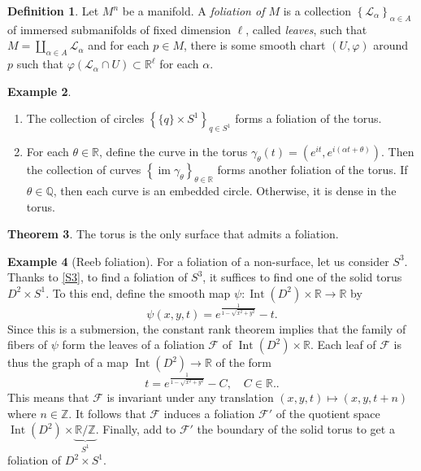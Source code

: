 \documentclass[10pt,letterpaper,cm]{nupset}
\theoremstyle{definition}
\newtheorem{definition}{Definition}[subsection]
\newtheorem{exmp}[definition]{Example}
\theoremstyle{theorem}
\newtheorem{theorem}[definition]{Theorem}
\theoremstyle{remark}
\renewcommand{\L}{\mathscr L}
\newcommand{\Q}{\mathbb Q}
\newcommand{\R}{\mathbb{R}}
\newcommand{\Z}{\mathbb Z}
\newcommand{\1}{\mathbb{1}}
\newcommand{\0}{\vec 0}
\DeclareMathOperator{\im}{im}
\DeclareMathOperator{\Int}{Int}
\begin{document}
\medskip

\begin{definition}
Let $M^n$ be a manifold. A \textit{foliation of $M$} is a collection $\left\{\L_{\alpha}\right\}_{\alpha \in A}$ of immersed submanifolds of fixed dimension $\ell$, called \textit{leaves}, such that $M = \coprod_{\alpha \in A}\L_{\alpha}$ and for each $p\in M$, there is some smooth chart $\left(U, \varphi\right)$ around $p$ such that $\varphi(\L_{\alpha} \cap U) \subset \R^{\ell}$ for each $\alpha$.
\end{definition}

\begin{exmp} $ $
\begin{enumerate}
\item The collection of circles $\left\{ \{q\} \times S^1\right\}_{q\in S^1}$ forms a foliation of the torus. 
\item For each $\theta \in \R$, define the curve in the torus $\gamma_{\theta}(t) = \left(e^{it}, e^{i(\alpha t + \theta)}\right)$. Then the collection of curves $\left\{\im{\gamma_{\theta}}\right\}_{\theta \in \R}$ forms another foliation of the torus. If $\theta \in \Q$, then each curve is an embedded circle. Otherwise, it is dense in the torus. 
\end{enumerate}
\end{exmp}

\begin{theorem}
The torus is the only surface that admits a foliation. 
\end{theorem}

\begin{exmp}[Reeb foliation]
For a foliation of a non-surface, let us consider $S^3$. Thanks to \cref{S3}, to find a foliation of $S^3$, it suffices to find one of the solid torus $D^2 \times S^1$. To this end, define the smooth map $\psi : \Int(D^2) \times \R \to \R$ by $$\psi(x,y,t) = e^{\frac{1}{1-\sqrt{x^2 + y^2}}} -t.$$ Since this is a submersion, the constant rank theorem implies that the family of fibers of $\psi$ form the leaves of a foliation $\mathcal{F}$ of $\Int(D^2) \times \R$. Each leaf of $\mathcal{F}$ is thus the graph of a map $\Int(D^2) \to \R$ of the form 
\[
t = e^{\frac{1}{1-\sqrt{x^2 + y^2}}} -C, \quad C \in \R.
.\] This means that $\mathcal{F}$ is invariant under any translation $\left(x,y,t\right) \mapsto \left(x,y, t+n\right)$ where $n\in \Z$. It follows that $\mathcal{F}$  induces a foliation $\mathcal{F}'$ of the quotient space $\Int(D^2) \times \underbrace{\R/\Z}_{S^1}$. Finally, add to $\mathcal{F}'$ the boundary of the solid torus to get a foliation of  $D^2 \times S^1$.
\end{exmp}
\end{document}
